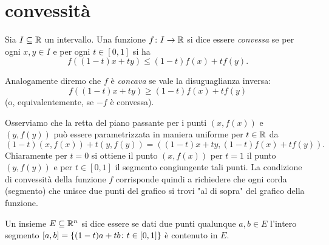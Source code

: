 \section{convessità}

\begin{definition}
\mymark{**}
Sia $I\subseteq \mathbb R$ un intervallo.
Una funzione $f\colon I\to \mathbb R$
si dice essere
\emph{convessa}
se per ogni $x,y\in I$ e per ogni $t\in [0,1]$ si ha
\[
f((1-t)x + ty) \le (1-t) f(x) + t f(y).
\]

Analogamente diremo che $f$ è \emph{concava} 
%
%
se vale la disuguaglianza inversa:
\[
f((1-t)x + ty) \ge (1-t) f(x) + t f(y)
\]
(o, equivalentemente, se $-f$ è convessa).
\end{definition}

Osserviamo che la retta del piano passante per i punti $(x,f(x))$ e $(y,f(y))$ può essere parametrizzata in maniera uniforme per $t\in \mathbb R$
da
\[
  (1-t) (x,f(x)) + t(y,f(y)) = ((1-t)x + ty, (1-t) f(x) + tf(y)).
\]
Chiaramente per $t=0$ si ottiene il punto $(x,f(x))$ per $t=1$ il punto $(y,f(y))$ e per $t\in[0,1]$ il segmento congiungente tali punti. La condizione di convessità della funzione $f$ corrisponde quindi a richiedere che ogni corda (segmento) che unisce due punti del grafico si trovi "al di sopra" del grafico della funzione.

\begin{definition}
\mymark{*}
Un insieme $E\subseteq \mathbb R^n$ si dice essere  se dati
due punti qualunque $a,b\in E$ l'intero segmento $[a,b]={\left\{ (1-t)a+tb\colon t\in [0,1] \right\}}$ è contenuto in $E$.
\end{definition}

